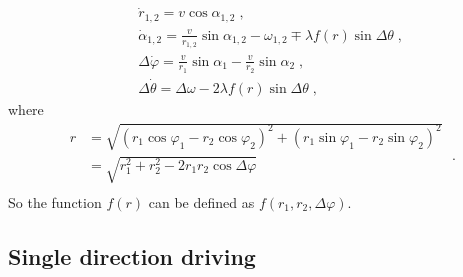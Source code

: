\documentclass{article}
\begin{document}
\begin{eqnarray}
    &&\dot{r}_{1,2}=v\cos \alpha _{1,2}\;,\\
    &&\dot{\alpha}_{1,2}=\frac{v}{r_{1,2}}\sin \alpha _{1,2}-\omega _{1,2}\mp \lambda f\left( r \right) \sin \Delta \theta\;,\\
    &&\Delta \dot{\varphi}=\frac{v}{r_1}\sin \alpha _1-\frac{v}{r_2}\sin \alpha _2\;,\\
    &&\Delta \dot{\theta}=\Delta \omega -2\lambda f\left( r \right) \sin \Delta \theta\;,
\end{eqnarray}
where
\begin{equation}
    \begin{aligned}
        r&=\sqrt{\left( r_1\cos \varphi _1-r_2\cos \varphi _2 \right) ^2+\left( r_1\sin \varphi _1-r_2\sin \varphi _2 \right) ^2}\\
        &=\sqrt{r_{1}^{2}+r_{2}^{2}-2r_1r_2\cos \Delta \varphi}\\
    \end{aligned}\;.
\end{equation}
So the function $f\left( r \right)$ can be defined as $f\left( r_1,r_2,\Delta \varphi \right)$.

\subsection{Single direction driving}
\end{document}
